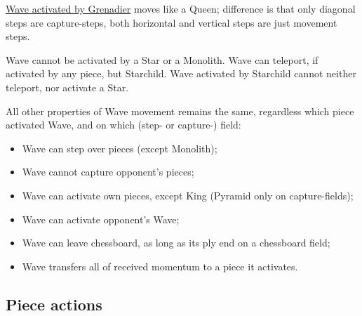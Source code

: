 \hyperref[fig:scn_hd_54_grenadier_activated_wave_step_field]{Wave activated by Grenadier}
moves like a Queen; difference is that only diagonal steps are capture-steps, both
horizontal and vertical steps are just movement steps.

Wave cannot be activated by a Star or a Monolith. Wave can teleport, if activated
by any piece, but Starchild. Wave activated by Starchild cannot neither teleport,
nor activate a Star.

All other properties of Wave movement remains the same, regardless which piece
activated Wave, and on which (step- or capture-) field:
\vspace*{-1.1\baselineskip}
\begin{itemize}
    \item Wave can step over pieces (except Monolith);
    \vspace*{-0.7\baselineskip}
    \item Wave cannot capture opponent's pieces;
    \vspace*{-0.7\baselineskip}
    \item Wave can activate own pieces, except King (Pyramid only on capture-fields);
    \vspace*{-0.7\baselineskip}
    \item Wave can activate opponent's Wave;
    \vspace*{-0.7\baselineskip}
    \item Wave can leave chessboard, as long as its ply end on a chessboard field;
    \vspace*{-0.7\baselineskip}
    \item Wave transfers all of received momentum to a piece it activates.
\end{itemize}

\clearpage %

\subsection*{Piece actions}
\label{sec:Appendix/Summary/Piece actions}

